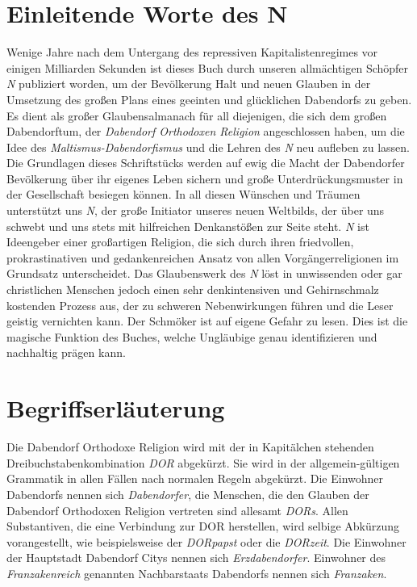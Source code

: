 \section{{Einleitende Worte des N}}
Wenige Jahre nach dem Untergang des repressiven Kapitalistenregimes vor einigen Milliarden Sekunden ist dieses Buch durch unseren allmächtigen Schöpfer \textit{N} publiziert worden, um der Bevölkerung Halt und neuen Glauben in der Umsetzung des großen Plans eines geeinten und glücklichen Dabendorfs zu geben. Es dient als großer Glaubensalmanach für all diejenigen, die sich dem großen Dabendorftum, der \textit{Dabendorf Orthodoxen Religion} angeschlossen haben, um die Idee des \textit{Maltismus-Dabendorfismus} und die Lehren des \textit{N} neu aufleben zu lassen. Die Grundlagen dieses Schriftstücks werden auf ewig die Macht der Dabendorfer Bevölkerung über ihr eigenes Leben sichern und große Unterdrückungsmuster in der Gesellschaft besiegen können. In all diesen Wünschen und Träumen unterstützt uns \textit{N}, der große Initiator unseres neuen Weltbilds, der über uns schwebt und uns stets mit hilfreichen Denkanstößen zur Seite steht. \textit{N} ist Ideengeber einer großartigen Religion, die sich durch ihren friedvollen, prokrastinativen und gedankenreichen Ansatz von allen Vorgängerreligionen im Grundsatz unterscheidet. Das Glaubenswerk des \textit{N} löst in unwissenden oder gar christlichen Menschen jedoch einen sehr denkintensiven und Gehirnschmalz kostenden Prozess aus, der zu schweren Nebenwirkungen führen und die Leser geistig vernichten kann. Der Schmöker ist auf eigene Gefahr zu lesen. Dies ist die magische Funktion des Buches, welche Ungläubige genau identifizieren und nachhaltig prägen kann.

\section{{Begriffserläuterung}}
Die Dabendorf Orthodoxe Religion wird mit der in Kapitälchen stehenden Dreibuchstabenkombination \textit{DOR} abgekürzt. Sie wird in der allgemein-gültigen Grammatik in allen Fällen nach normalen Regeln abgekürzt. Die Einwohner Dabendorfs nennen sich \textit{Dabendorfer}, die Menschen, die den Glauben der Dabendorf Orthodoxen Religion vertreten sind allesamt \textit{DORs}. Allen Substantiven, die eine Verbindung zur DOR herstellen, wird selbige Abkürzung vorangestellt, wie beispielsweise der \textit{DORpapst} oder die \textit{DORzeit}. Die Einwohner der Hauptstadt Dabendorf Citys nennen sich \textit{Erzdabendorfer}. Einwohner des \textit{Franzakenreich} genannten Nachbarstaats Dabendorfs nennen sich \textit{Franzaken}.

